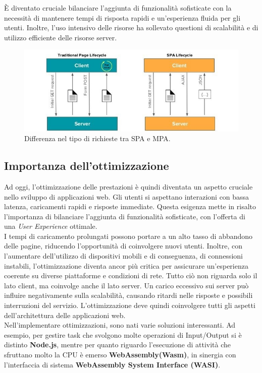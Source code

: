 È diventato cruciale bilanciare l'aggiunta di funzionalità sofisticate con la necessità di mantenere tempi di risposta rapidi e un'esperienza fluida per gli utenti. Inoltre, l'uso intensivo delle risorse ha sollevato questioni di scalabilità e di utilizzo efficiente delle risorse server.
\begin{figure}
        \begin{center}
                \includegraphics[width=0.9\columnwidth]{images/spa.jpg}
        \end{center}
        \caption{Differenza nel tipo di richieste tra SPA e MPA.}
        \label{fig:spa}
\end{figure}
        
\subsection{Importanza dell'ottimizzazione}
Ad oggi, l'ottimizzazione delle prestazioni è quindi diventata un aspetto cruciale nello sviluppo di applicazioni web.
Gli utenti si aspettano interazioni con bassa latenza, caricamenti rapidi e risposte immediate.
Questa esigenza mette in risalto l'importanza di bilanciare l'aggiunta di funzionalità sofisticate, con l'offerta di una \emph{User Experience} ottimale.
\\I tempi di caricamento prolungati possono portare a un alto tasso di abbandono delle pagine, riducendo l'opportunità di coinvolgere nuovi utenti.
Inoltre, con l'aumentare dell'utilizzo di dispositivi mobili e di conseguenza, di connessioni instabili, l'ottimizzazione diventa ancor più critica per assicurare un'esperienza coerente su diverse piattaforme e condizioni di rete.
Tutto ciò non riguarda solo il lato client, ma coinvolge anche il lato server. 
Un carico eccessivo sui server può influire negativamente sulla scalabilità, causando ritardi nelle risposte e possibili interruzioni del servizio.
L'ottimizzazione deve quindi coinvolgere tutti gli aspetti dell'architettura delle applicazioni web.
\\Nell'implementare ottimizzazioni, sono nati varie soluzioni interessanti. Ad esempio, per gestire task che svolgono molte operazioni di Input/Output si è distinto \textbf{Node.js}, mentre per quanto riguardo l'esecuzione di attività che sfruttano molto la CPU è emerso \textbf{WebAssembly(Wasm)}, in sinergia con l'interfaccia di sistema \textbf{WebAssembly System Interface (WASI)}.


